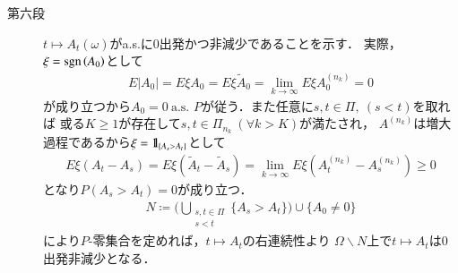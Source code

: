 \begin{prf}
\begin{description}
			\item[第六段]
				$t \longmapsto A_t(\omega)$がa.s.に0出発かつ非減少であることを示す．
				実際，$\xi = \operatorname{sgn}\left( A_0 \right)$として
				\begin{align}
					E |A_0| = E \xi A_0 = E \xi \tilde{A}_0 = \lim_{k \to \infty} E \xi A^{(n_k)}_0 = 0
				\end{align}
				が成り立つから$A_0 = 0\ \mbox{a.s. $P$}$が従う．また任意に$s,t \in \Pi,\ (s<t)$を取れば
				或る$K \geq 1$が存在して$s,t \in \Pi_{n_k}\ (\forall k > K)$が満たされ，
				$A^{(n_k)}$は増大過程であるから$\xi = \mbox{1}\hspace{-0.25em}\mbox{l}_{\{A_s > A_t\}}$として
				\begin{align}
					E \xi (A_t - A_s) = E \xi \left( \tilde{A}_t - \tilde{A}_s \right)
					= \lim_{k \to \infty} E \xi \left( A^{(n_k)}_t - A^{(n_k)}_s \right) \geq 0 
				\end{align}
				となり$P(A_s > A_t) = 0$が成り立つ．
				\begin{align}
					N \coloneqq \Biggl(\bigcup_{\substack{s,t \in \Pi \\ s < t}} \{A_s > A_t\}\Biggr) \cup \{A_0 \neq 0\}
				\end{align}
				により$P$-零集合を定めれば，$t \longmapsto A_t$の右連続性より
				$\Omega \backslash N$上で$t \longmapsto A_t$は0出発非減少となる．
				

\end{description}
\end{prf}
